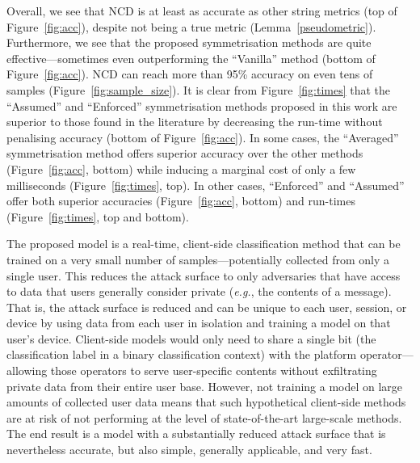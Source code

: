 \documentclass[preprint,12pt]{article}
\begin{document}
Overall, we see that NCD is at least as accurate as other string metrics (top of Figure~\ref{fig:acc}), despite not being a true metric (Lemma~\ref{pseudometric}). 
Furthermore, we see that the proposed symmetrisation methods are quite effective---sometimes even outperforming the ``Vanilla'' method (bottom of Figure~\ref{fig:acc}). 
NCD can reach more than 95\% accuracy on even tens of samples (Figure~\ref{fig:sample_size}).
It is clear from Figure~\ref{fig:times} that the ``Assumed'' and ``Enforced'' symmetrisation methods proposed in this work are superior to those found in the literature by decreasing the run-time without penalising accuracy (bottom of Figure~\ref{fig:acc}).
In some cases, the ``Averaged'' symmetrisation method offers superior accuracy over the other methods (Figure~\ref{fig:acc}, bottom) while inducing a marginal cost of only a few milliseconds (Figure~\ref{fig:times}, top).
In other cases, ``Enforced'' and ``Assumed'' offer both superior accuracies (Figure~\ref{fig:acc}, bottom) and run-times (Figure~\ref{fig:times}, top and bottom).

The proposed model is a real-time, client-side classification method that can be trained on a very small number of samples---potentially collected from only a single user.
This reduces the attack surface to only adversaries that have access to data that users generally consider private (\textit{e.g.}, the contents of a message). 
That is, the attack surface is reduced and can be unique to each user, session, or device by using data from each user in isolation and training a model on that user's device. Client-side models would only need to share a single bit (the classification label in a binary classification context) with the platform operator---allowing those operators to serve user-specific contents without exfiltrating private data from their entire user base. 
However, not training a model on large amounts of collected user data means that such hypothetical client-side methods are at risk of not performing at the level of state-of-the-art large-scale methods.
The end result is a model with a substantially reduced attack surface that is nevertheless accurate, but also simple, generally applicable, and very fast.



 

\end{document}
